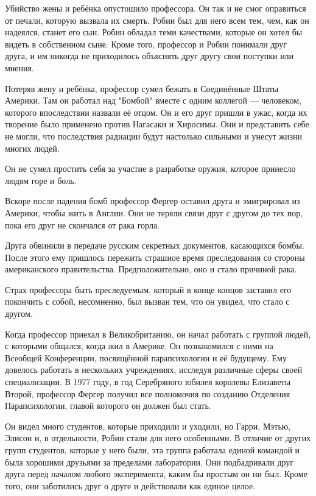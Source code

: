 \documentclass[a4paper,12pt]{book}
\begin{document}
\par
Убийство жены и ребёнка опустошило профессора. Он так и не смог оправиться от печали, которую вызвала их смерть. Робин был для него всем тем, чем, как он надеялся, станет его сын. Робин обладал теми качествами, которые он хотел бы видеть в собственном сыне. Кроме того, профессор и Робин понимали друг друга, и им никогда не приходилось объяснять друг другу свои поступки или мнения.
\par
Потеряв жену и ребёнка, профессор сумел бежать в Соединённые Штаты Америки. Там он работал над "Бомбой" вместе с одним коллегой — человеком, которого впоследствии назвали её отцом. Он и его друг пришли в ужас, когда их творение было применено против Нагасаки и Хиросимы. Они и представить себе не могли, что последствия радиации будут настолько сильными и унесут жизни многих людей.
\par
Он не сумел простить себя за участие в разработке оружия, которое принесло людям горе и боль.
\par
Вскоре после падения бомб профессор Фергер оставил друга и эмигрировал из Америки, чтобы жить в Англии. Они не теряли связи друг с другом до тех пор, пока его друг не скончался от рака горла.
\par
Друга обвинили в передаче русским секретных документов, касающихся бомбы. После этого ему пришлось пережить страшное время преследования со стороны американского правительства. Предположительно, оно и стало причиной рака.
\par
Страх профессора быть преследуемым, который в конце концов заставил его покончить с собой, несомненно, был вызван тем, что он увидел, что стало с другом.
\par
Когда профессор приехал в Великобританию, он начал работать с группой людей, с которыми общался, когда жил в Америке. Он познакомился с ними на Всеобщей Конференции, посвящённой парапсихологии и её будущему. Ему довелось работать в нескольких учреждениях, исследуя различные сферы своей специализации. В 1977 году, в год Серебряного юбилея королевы Елизаветы Второй, профессор Фергер получил все полномочия по созданию Отделения Парапсихологии, главой которого он должен был стать.
\par
Он видел много студентов, которые приходили и уходили, но Гарри, Мэтью, Элисон и, в отдельности, Робин стали для него особенными. В отличие от других групп студентов, которые у него были, эта группа работала единой командой и была хорошими друзьями за пределами лаборатории. Они подбадривали друг друга перед началом любого эксперимента, каким бы простым он ни был. Кроме того, они заботились друг о друге и действовали как единое целое.\\
\end{document}
